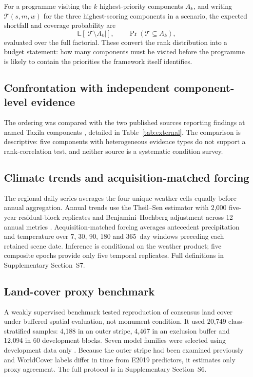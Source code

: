 For a programme visiting the $k$ highest-priority components $A_k$, and writing
$\mathcal T(s,m,w)$ for the three highest-scoring components in a scenario, the
expected shortfall and coverage probability are
\begin{equation}\label{eq:coverage}
\mathbb E\!\left[\left|\mathcal T\setminus A_k\right|\right],\qquad
\Pr\!\left(\mathcal T\subseteq A_k\right),
\end{equation}
evaluated over the full factorial. These convert the rank distribution into a
budget statement: how many components must be visited before the programme is
likely to contain the priorities the framework itself identifies.

\subsection{Confrontation with independent component-level evidence}
The ordering was compared with the two published sources reporting findings at named Taxila components \citep{khan2022taxila,butt2025taxila}, detailed in Table~\ref{tab:external}. The comparison is descriptive: five components with heterogeneous evidence types do not support a rank-correlation test, and neither source is a systematic condition survey.

\subsection{Climate trends and acquisition-matched forcing}
The regional daily series averages the four unique weather cells equally before annual aggregation. Annual trends use the Theil--Sen estimator with 2,000 five-year residual-block replicates and Benjamini--Hochberg adjustment across 12 annual metrics \citep{sen1968slope,yue2002autocorrelation,benjamini1995fdr}. Acquisition-matched forcing averages antecedent precipitation and temperature over 7, 30, 90, 180 and 365~day windows preceding each retained scene date. Inference is conditional on the weather product; five composite epochs provide only five temporal replicates. Full definitions in Supplementary Section~S7.

\subsection{Land-cover proxy benchmark}
A weakly supervised benchmark tested reproduction of consensus land cover under buffered spatial evaluation, not monument condition. It used 20,749 class-stratified samples: 4,188 in an outer stripe, 4,467 in an exclusion buffer and 12,094 in 60 development blocks. Seven model families were selected using development data only \citep{roberts2017cv,meyer2018target,valavi2019blockcv,olofsson2014accuracy}. Because the outer stripe had been examined previously and WorldCover labels differ in time from E2019 predictors, it estimates only proxy agreement. The full protocol is in Supplementary Section~S6.


